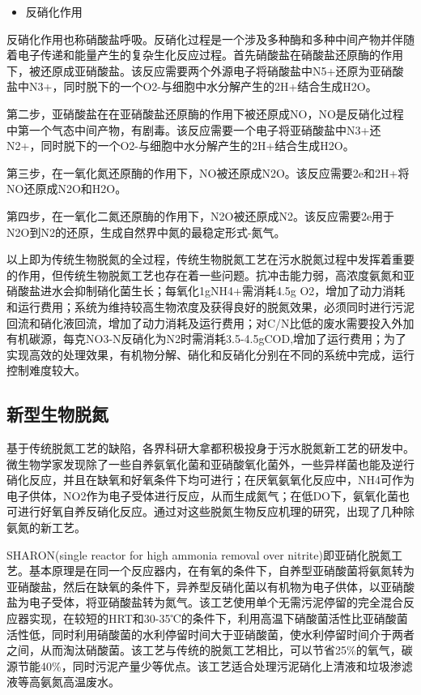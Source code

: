 \documentclass[]{book}
\providecommand{\tightlist}{%
  \setlength{\itemsep}{0pt}\setlength{\parskip}{0pt}}
\begin{document}
\begin{itemize}
\tightlist
\item
  反硝化作用
\end{itemize}

反硝化作用也称硝酸盐呼吸。反硝化过程是一个涉及多种酶和多种中间产物并伴随着电子传递和能量产生的复杂生化反应过程。首先硝酸盐在硝酸盐还原酶的作用下，被还原成亚硝酸盐。该反应需要两个外源电子将硝酸盐中N5+还原为亚硝酸盐中N3+，同时脱下的一个O2-与细胞中水分解产生的2H+结合生成H2O。

第二步，亚硝酸盐在在亚硝酸盐还原酶的作用下被还原成NO，NO是反硝化过程中第一个气态中间产物，有剧毒。该反应需要一个电子将亚硝酸盐中N3+还N2+，同时脱下的一个O2-与细胞中水分解产生的2H+结合生成H2O。

第三步，在一氧化氮还原酶的作用下，NO被还原成N2O。该反应需要2e和2H+将NO还原成N2O和H2O。

第四步，在一氧化二氮还原酶的作用下，N2O被还原成N2。该反应需要2e用于N2O到N2的还原，生成自然界中氮的最稳定形式-氮气。

以上即为传统生物脱氮的全过程，传统生物脱氮工艺在污水脱氮过程中发挥着重要的作用，但传统生物脱氮工艺也存在着一些问题。抗冲击能力弱，高浓度氨氮和亚硝酸盐进水会抑制硝化菌生长；每氧化1gNH4+需消耗4.5g O2，增加了动力消耗和运行费用；系统为维持较高生物浓度及获得良好的脱氮效果，必须同时进行污泥回流和硝化液回流，增加了动力消耗及运行费用；对C/N比低的废水需要投入外加有机碳源，每克NO3-N反硝化为N2时需消耗3.5-4.5gCOD,增加了运行费用；为了实现高效的处理效果，有机物分解、硝化和反硝化分别在不同的系统中完成，运行控制难度较大。

\hypertarget{ux65b0ux578bux751fux7269ux8131ux6c2e}{%
\subsection{新型生物脱氮}\label{ux65b0ux578bux751fux7269ux8131ux6c2e}}

基于传统脱氮工艺的缺陷，各界科研大拿都积极投身于污水脱氮新工艺的研发中。微生物学家发现除了一些自养氨氧化菌和亚硝酸氧化菌外，一些异样菌也能及逆行硝化反应，并且在缺氧和好氧条件下均可进行；在厌氧氨氧化反应中，NH4可作为电子供体，NO2作为电子受体进行反应，从而生成氮气；在低DO下，氨氧化菌也可进行好氧自养反硝化反应。通过对这些脱氮生物反应机理的研究，出现了几种除氨氮的新工艺。

SHARON(single reactor for high ammonia removal over nitrite)即亚硝化脱氮工艺。基本原理是在同一个反应器内，在有氧的条件下，自养型亚硝酸菌将氨氮转为亚硝酸盐，然后在缺氧的条件下，异养型反硝化菌以有机物为电子供体，以亚硝酸盐为电子受体，将亚硝酸盐转为氮气。该工艺使用单个无需污泥停留的完全混合反应器实现，在较短的HRT和30-35℃的条件下，利用高温下硝酸菌活性比亚硝酸菌活性低，同时利用硝酸菌的水利停留时间大于亚硝酸菌，使水利停留时间介于两者之间，从而淘汰硝酸菌。该工艺与传统的脱氮工艺相比，可以节省25\%的氧气，碳源节能40\%，同时污泥产量少等优点。该工艺适合处理污泥硝化上清液和垃圾渗滤液等高氨氮高温废水。
\end{document}
